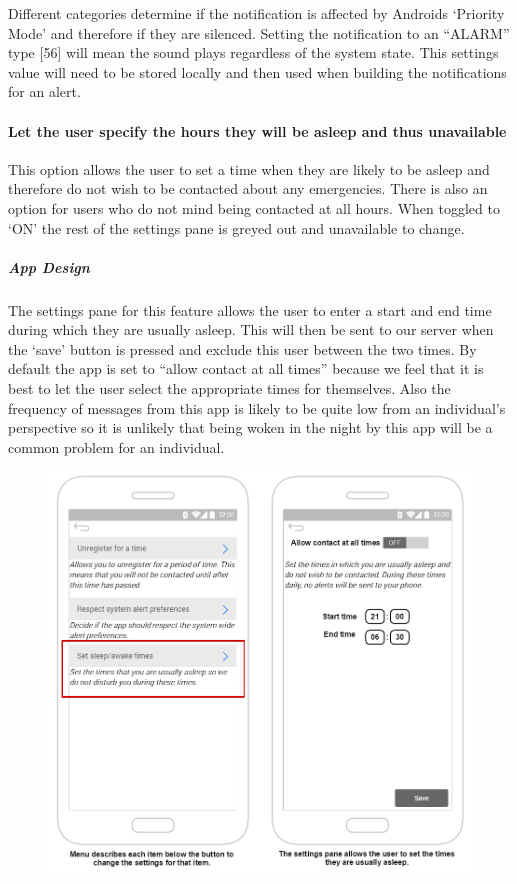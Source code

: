 \documentclass{article}
\begin{document}
Different categories determine if the notification is affected by Androids ‘Priority Mode’ and therefore if they are silenced. Setting the notification to an “ALARM” type [56] will mean the sound plays regardless of the system state. This settings value will need to be stored locally and then used when building the notifications for an alert.

\paragraph{Let the user specify the hours they will be asleep and thus unavailable}
This option allows the user to set a time when they are likely to be asleep and therefore do not wish to be contacted about any emergencies. There is also an option for users who do not mind being contacted at all hours. When toggled to ‘ON’ the rest of the settings pane is greyed out and unavailable to change.

\subparagraph{App Design}
The settings pane for this feature allows the user to enter a start and end time during which they are usually asleep. This will then be sent to our server when the ‘save’ button is pressed and exclude this user between the two times. By default the app is set to “allow contact at all times” because we feel that it is best to let the user select the appropriate times for themselves. Also the frequency of messages from this app is likely to be quite low from an individual's perspective so it is unlikely that being woken in the night by this app will be a common problem for an individual.\\
	\begin{figure}[H]
		\centering
		\vspace{-20pt}
		\includegraphics[width=1\textwidth]{"Iteration5/Storyboard - Iteration 6 - 3"}
		\vspace{-20pt}
	\end{figure}
	
\end{document}
